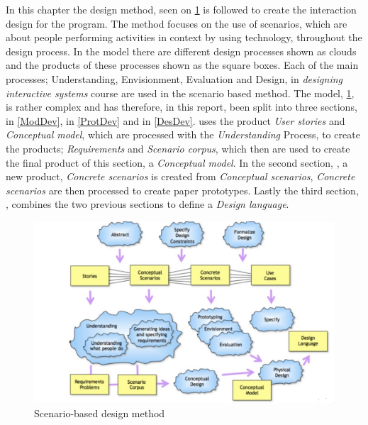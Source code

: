 In this chapter the design method, seen on \cref{scenarioModel} is followed to create the interaction design for the program. The method focuses on the use of scenarios, which are about people performing activities in context by using technology, throughout the design process. In the model there are different design processes shown as clouds and the products of these processes shown as the square boxes. Each of the main processes; Understanding, Envisionment, Evaluation and Design, in \textit{designing interactive systems} course are used in the scenario based method. The model, \cref{scenarioModel}, is rather complex and has therefore, in this report, been split into three sections,  in \ref{ModDev},  in \ref{ProtDev} and  in \ref{DesDev}.  uses the product \textit{User stories} and \textit{Conceptual model}, which are processed with the \textit{Understanding} Process, to create the products; \textit{Requirements} and \textit{Scenario corpus}, which then are used to create the final product of this section, a \textit{Conceptual model}. In the second section, , a new product, \textit{Concrete scenarios} is created from \textit{Conceptual scenarios}, \textit{Concrete scenarios} are then processed to create paper prototypes. Lastly the third section, , combines the two previous sections to define a \textit{Design language}.

\begin{figure}[H]
	\centering
	\includegraphics[width=1\textwidth]{Grafik/scenarioModel}
	\caption{Scenario-based design method}
	\label{scenarioModel}
\end{figure}